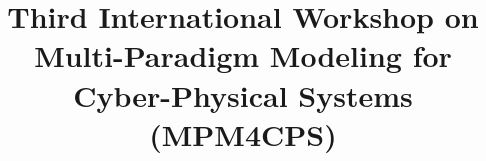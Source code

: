 
\newif\iflncs
\lncstrue

\iflncs
    
\else
    
\fi



\title{Third International Workshop on Multi-Paradigm Modeling for Cyber-Physical Systems ({MPM4CPS})}
\iflncs
\fi

\iflncs
    \author{}
    \institute{}
\else
    \author{Eugene Syriani}
    \affiliation{%
      \institution{Universit\'e de Montr\'eal}
      \country{Canada}
    }
    \email{syriani@iro.umontreal.ca}
    
    \author{Manuel Wimmer}
    \affiliation{%
      \institution{JKU Linz}
      \country{Austria}
    }
    \email{wimmer@big.tuwien.ac.at}
    
    \author{Dominique Blouin}
    \affiliation{%
        \institution{T\'el\'ecom ParisTech}
        \country{France}
    }
    \email{dominique.blouin@telecom-paristech.fr}
    
    \author{Moussa Amrani}
    \affiliation{%
        \institution{Universit\'e de Namur}
        \country{Belgium}
    }
    \email{Moussa.Amrani@unamur.be}
    
    \author{Julien Deantoni}
    \affiliation{%
        \institution{Universit\'e Nice - Sophia Antipolis}
        \country{France}
    }
    \email{julien.deantoni@univ-cotedazur.fr}
    
    \author{Hans Vangheluwe}
    \affiliation{%
      \institution{University of Antwerp - Flanders Make vzw}
    }
    \affiliation{%
        \institution{McGill University}
        \country{Canada}
    }
    \email{hans.vangheluwe@uantwerpen.be}
 
    \author{Pieter Mosterman}
    \affiliation{%
      \institution{The Mathworks}
    }
    \email{Pieter.Mosterman@mathworks.com}
   
    \author{Jeff Gray}
    \affiliation{%
        \institution{University of Alabama }
        \country{USA}
    }
    \email{gray@cs.ua.edu}
    
    \author{Vasco Amaral}
    \affiliation{%
        \institution{Universidade NOVA de Lisboa}
        \country{Portugal}
    }
    \email{vasco.amaral@fct.unl.pt}
    \renewcommand{\shortauthors}{Van Mierlo, Syriani, Wimmer, Blouin, Amrani, Deantoni, Vangheluwe, Gray, Amaral}
\fi

